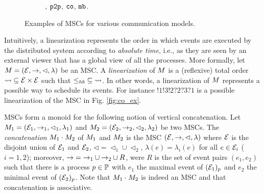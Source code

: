 \begin{figure}[t]
\begin{subfigure}[t]{0.3\textwidth}
	\caption{\asy, $\mathtt{p2p}$, $\mathtt{co}$, $\mathtt{mb}$.} 
	\label{fig:pp_um_ex}
\end{subfigure}
		\caption{Examples of MSCs for various communication models.}\label{fig:exmscs}
\end{figure}


Intuitively, a linearization represents the order in which events are executed by the distributed system according to \emph{absolute time}, i.e., as they are seen by an external viewer that has a global view of all the processes. More formally, let $M = (\mathcal{E},\to,\lhd,\lambda)$ be an MSC.
A \emph{linearization} of $M$ is a (reflexive) total order ${\rightsquigarrow} \subseteq \mathcal{E} \times \mathcal{E}$ such that ${\leq_{hb}} \subseteq {\rightsquigarrow}$. In other words, a linearization of $M$ represents a possible way to schedule its events. For instance $!1!3!2?2?3?1$ is a possible linearization of the MSC in Fig. \ref{fig:co_ex}.

MSCs form a monoid for the following notion of vertical concatenation.
Let $M_1 = (\mathcal{E}_1,\to_1,\lhd_1,\lambda_1)$ and
$M_2 = (\mathcal{E}_2,\to_2,\lhd_2,\lambda_2)$ be two MSCs.
The \emph{concatenation} $M_1 \cdot M_2$ of $M_1$ and $M_2$ is the MSC 
$(\mathcal{E},\to,\lhd,\lambda)$ where $\mathcal{E}$ is the disjoint 
union of $\mathcal{E}_1$ and $\mathcal{E}_2$,
${\lhd}  = {\lhd_1} \cup {\lhd_2}$, $\lambda(e)=\lambda_i(e)$ for all $e\in \mathcal{E}_i$ ($i=1,2$); 
moreover, ${\to} = {\to_1} \cup {\to_2} \cup R$,
were $R$ is the set of event pairs $(e_1,e_2)$ 
such that there is a process $p \in \mathbb{P}$ with $e_1$ the maximal event of 
$(\mathcal{E}_1)_p$ and $e_2$ the minimal event of
$(\mathcal{E}_2)_p$.
Note that $M_1 \cdot M_2$ is indeed an MSC and that
concatenation is associative.


